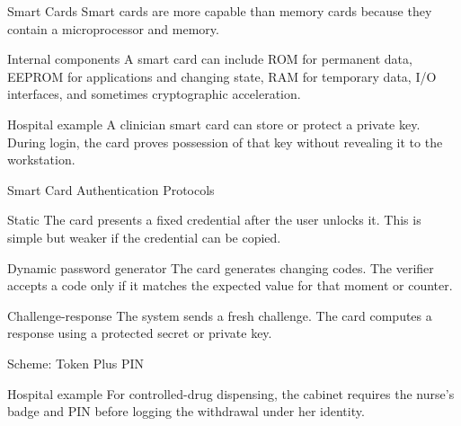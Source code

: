 \documentclass[presentation]{beamer}
\begin{document}
\begin{frame}[c]{Smart Cards}
  Smart cards are more capable than memory cards because they contain a microprocessor and memory.

  \begin{block}{Internal components}
    A smart card can include ROM for permanent data, EEPROM for applications and changing state, RAM for temporary data, I/O interfaces, and sometimes cryptographic acceleration.
  \end{block}

  \begin{exampleblock}{Hospital example}
    A clinician smart card can store or protect a private key. During login, the card proves possession of that key without revealing it to the workstation.
  \end{exampleblock}
\end{frame}

\begin{frame}[c]{Smart Card Authentication Protocols}
  \begin{block}{Static}
    The card presents a fixed credential after the user unlocks it. This is simple but weaker if the credential can be copied.
  \end{block}

  \begin{block}{Dynamic password generator}
    The card generates changing codes. The verifier accepts a code only if it matches the expected value for that moment or counter.
  \end{block}

  \begin{block}{Challenge-response}
    The system sends a fresh challenge. The card computes a response using a protected secret or private key.
  \end{block}
\end{frame}

\begin{frame}[c]{Scheme: Token Plus PIN}
  \begin{center}
  \end{center}

  \vspace{0.45cm}
  \begin{exampleblock}{Hospital example}
    For controlled-drug dispensing, the cabinet requires the nurse's badge and PIN before logging the withdrawal under her identity.
  \end{exampleblock}
\end{frame}
\end{document}
